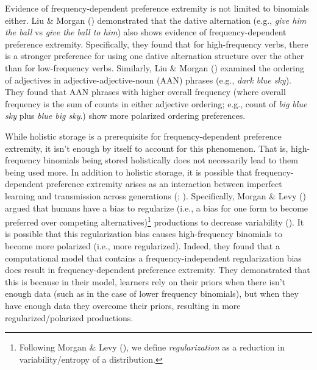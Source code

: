 \documentclass[
  12pt,
]{scrartcl}
\begin{document}
Evidence of frequency-dependent preference extremity is not limited to
binomials either. Liu \& Morgan
()
demonstrated that the dative alternation (e.g., \emph{give him the ball}
vs \emph{give the ball to him}) also shows evidence of
frequency-dependent preference extremity. Specifically, they found that
for high-frequency verbs, there is a stronger preference for using one
dative alternation structure over the other than for low-frequency
verbs. Similarly, Liu \& Morgan
()
examined the ordering of adjectives in adjective-adjective-noun (AAN)
phrases (e.g., \emph{dark blue sky}). They found that AAN phrases with
higher overall frequency (where overall frequency is the sum of counts
in either adjective ordering; e.g., count of \emph{big blue sky} plus
\emph{blue big sky}.) show more polarized ordering preferences.

While holistic storage is a prerequisite for frequency-dependent
preference extremity, it isn't enough by itself to account for this
phenomenon. That is, high-frequency binomials being stored holistically
does not necessarily lead to them being used more. In addition to
holistic storage, it is possible that frequency-dependent preference
extremity arises as an interaction between imperfect learning and
transmission across generations
(;
). Specifically, Morgan \& Levy
()
argued that humans have a bias to regularize (i.e., a bias for one form
to become preferred over competing alternatives)\footnote{Following
  Morgan \& Levy
  (),
  we define \emph{regularization} as a reduction in variability/entropy
  of a distribution.} productions to decrease variability
(). It is possible that this regularization bias
causes high-frequency binomials to become more polarized (i.e., more
regularized). Indeed, they found that a computational model that
contains a frequency-independent regularization bias does result in
frequency-dependent preference extremity. They demonstrated that this is
because in their model, learners rely on their priors when there isn't
enough data (such as in the case of lower frequency binomials), but when
they have enough data they overcome their priors, resulting in more
regularized/polarized productions.
\end{document}
